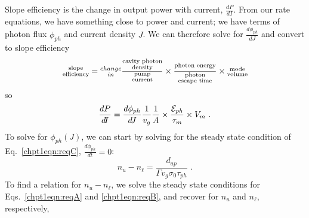 \documentclass[12pt]{report}
\begin{document}
Slope efficiency is the change in output power with current, $\frac{d P}{dI}$.  From our rate equations, we have something close to power and current; we have terms of photon flux $\phi_{ph}$ and current density $J$.  We can therefore solve for $\frac{d \phi_{ph}}{dJ}$ and convert to slope efficiency
\begin{equation}
\begin{subarray}{c}\textnormal{slope}\\\textnormal{efficiency}\end{subarray} = \begin{subarray}{c}change\\in\end{subarray} \frac{\begin{subarray}{c}\textnormal{cavity photon}\\\textnormal{density}\end{subarray}}{\begin{subarray}{c}\textnormal{pump}\\\textnormal{current}\end{subarray}} \times \frac{\begin{subarray}{c}\textnormal{photon energy}\end{subarray}} {\begin{subarray}{c}\textnormal{photon}\\\textnormal{escape time}\end{subarray}} \times \begin{subarray}{c}\textnormal{mode}\\\textnormal{volume}\end{subarray}
\end{equation}
so
\begin{equation}
\frac{d P}{d\!I} = \frac{d \phi_{ph}}{d\!J} \frac{1}{v_g} \frac{1}{A} \times \frac{\EE_{ph}}{\tau_m} \times V_m \text{~.}
\end{equation}
To solve for $\phi_{ph}(J)$, we can start by solving for the steady state condition of Eq.~\eqref{chpt1eqn:reqC}, $\frac{d \phi_{ph}}{d\!t}=0$:
\begin{equation}
\label{chpt1eqn:n_uminusn_l_easy}
n_u-n_\ell=\frac{d_{ap}}{\Gamma v_g \sigma_0 \tau_{ph}} \text{~.}
\end{equation}
To find a relation for $n_u-n_\ell$, we solve the steady state conditions for Eqs.~\eqref{chpt1eqn:reqA} and \eqref{chpt1eqn:reqB}, and recover for $n_u$ and $n_\ell$, respectively,
\end{document}
